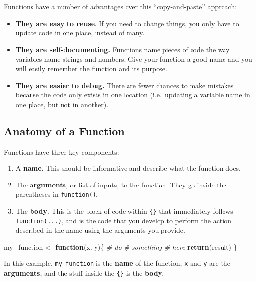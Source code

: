 \documentclass[]{book}
\newenvironment{Shaded}{\begin{snugshade}}{\end{snugshade}}
\newcommand{\CommentTok}[1]{\textcolor[rgb]{0.56,0.35,0.01}{\textit{#1}}}
\newcommand{\ControlFlowTok}[1]{\textcolor[rgb]{0.13,0.29,0.53}{\textbf{#1}}}
\newcommand{\KeywordTok}[1]{\textcolor[rgb]{0.13,0.29,0.53}{\textbf{#1}}}
\newcommand{\NormalTok}[1]{#1}
\newcommand{\StringTok}[1]{\textcolor[rgb]{0.31,0.60,0.02}{#1}}
\providecommand{\tightlist}{%
  \setlength{\itemsep}{0pt}\setlength{\parskip}{0pt}}
\begin{document}
Functions have a number of advantages over this ``copy-and-paste'' approach:

\begin{itemize}
\item
  \textbf{They are easy to reuse.} If you need to change things, you only have to update code in one place, instead of many.
\item
  \textbf{They are self-documenting.} Functions name pieces of code the way variables name strings and numbers. Give your function a good name and you will easily remember the function and its purpose.
\item
  \textbf{They are easier to debug.} There are fewer chances to make mistakes because the code only exists in one location (i.e.~updating a variable name in one place, but not in another).
\end{itemize}

\hypertarget{anatomy-of-a-function}{%
\subsection{Anatomy of a Function}\label{anatomy-of-a-function}}

Functions have three key components:

\begin{enumerate}
\def\labelenumi{\arabic{enumi}.}
\tightlist
\item
  A \textbf{name}. This should be informative and describe what the function does.
\item
  The \textbf{arguments}, or list of inputs, to the function. They go inside the parentheses in \texttt{function()}.
\item
  The \textbf{body}. This is the block of code within \texttt{\{\}} that immediately follows \texttt{function(...)}, and is the code that you develop to perform the action described in the name using the arguments you provide.
\end{enumerate}

\begin{Shaded}
\begin{Highlighting}[]
\NormalTok{my_function <-}\StringTok{ }\ControlFlowTok{function}\NormalTok{(x, y)\{}
  \CommentTok{# do}
  \CommentTok{# something}
  \CommentTok{# here}
  \KeywordTok{return}\NormalTok{(result)}
\NormalTok{\}}
\end{Highlighting}
\end{Shaded}

In this example, \texttt{my\_function} is the \textbf{name} of the function, \texttt{x} and \texttt{y} are the \textbf{arguments}, and the stuff inside the \texttt{\{\}} is the \textbf{body}.
\end{document}
